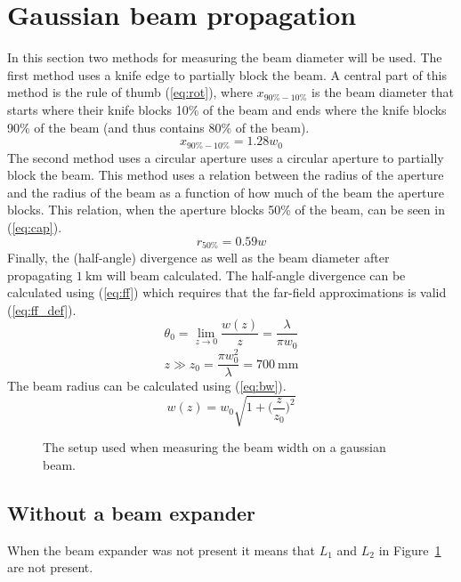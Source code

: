 \documentclass[12pt,a4paper]{article}
\begin{document}
\section{Gaussian beam propagation}
In this section two methods for measuring the beam diameter will be used. The first method uses a knife edge to partially block the beam. A central part of this method is the rule of thumb (\ref{eq:rot}), where $x_{90\%-10\%}$ is the beam diameter that starts where their knife blocks 10\% of the beam and ends where the knife blocks 90\% of the beam (and thus contains 80\% of the beam).
\begin{equation}
  \label{eq:rot}
  x_{90\%-10\%}=1.28w_0
\end{equation}
The second method uses a circular aperture uses a circular aperture to partially block the beam. This method uses a relation between the radius of the aperture and the radius of the beam as a function of how much of the beam the aperture blocks. This relation, when the aperture blocks 50\% of the beam, can be seen in (\ref{eq:cap}).
\begin{equation}
  \label{eq:cap}
  r_{50\%}=0.59w
\end{equation}
Finally, the (half-angle) divergence as well as the beam diameter after propagating $\SI{1}{\kilo\metre}$ will beam calculated. The half-angle divergence can be calculated using (\ref{eq:ff}) which requires that the far-field approximations is valid (\ref{eq:ff_def}).
\begin{equation}
  \label{eq:ff}
  \theta_0=\lim_{z\rightarrow 0}\frac{w(z)}{z}=\frac{\lambda}{\pi w_0}
\end{equation}
\begin{equation}
  \label{eq:ff_def}
  z \gg z_0=\frac{\pi w_0^2}{\lambda}=\SI{700}{\milli\metre}
\end{equation}
The beam radius can be calculated using (\ref{eq:bw}).
\begin{equation}
  \label{eq:bw}
  w(z)=w_0\sqrt{1+\Big(\frac{z}{z_0}\Big)^2}
\end{equation}
\begin{figure}[h]
  \centering
  \noindent\makebox[\textwidth]{\scalebox{0.90}{}}
  \caption{The setup used when measuring the beam width on a gaussian beam.}
  \label{fig:gauss_setup}
\end{figure}
\subsection{Without a beam expander}
When the beam expander was not present it means that $L_1$ and $L_2$ in Figure~\ref{fig:gauss_setup} are not present.
\end{document}
